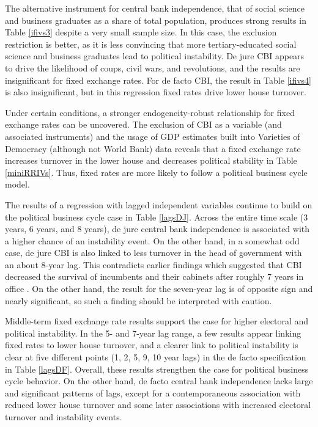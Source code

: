 \documentclass{article}
\begin{document}
    
    

    The alternative instrument for central bank independence, that of social science and business graduates as a share of total population, produces strong results in Table \ref*{ifivs3} despite a very small sample size. In this case, the exclusion restriction is better, as it is less convincing that more tertiary-educated social science and business graduates lead to political instability. De jure CBI appears to drive the likelihood of coups, civil wars, and revolutions, and the results are insignificant for fixed exchange rates. For de facto CBI, the result in Table \ref*{ifivs4} is also insignificant, but in this regression fixed rates drive lower house turnover.

    
    

    Under certain conditions, a stronger endogeneity-robust relationship for fixed exchange rates can be uncovered. The exclusion of CBI as a variable (and associated instruments) and the usage of GDP estimates built into Varieties of Democracy (although not World Bank) data reveals that a fixed exchange rate increases turnover in the lower house and decreases political stability in Table \ref*{miniRRIVs}. Thus, fixed rates are more likely to follow a political business cycle model.

    

    The results of a regression with lagged independent variables continue to build on the political business cycle case in Table \ref*{lagsDJ}. Across the entire time scale (3 years, 6 years, and 8 years), de jure central bank independence is associated with a higher chance of an instability event. On the other hand, in a somewhat odd case, de jure CBI is also linked to less turnover in the head of government with an about 8-year lag. This contradicts earlier findings which suggested that CBI decreased the survival of incumbents and their cabinets after roughly 7 years in office \citep{clark_monetary_2013}. On the other hand, the result for the seven-year lag is of opposite sign and nearly significant, so such a finding should be interpreted with caution.

    Middle-term fixed exchange rate results support the case for higher electoral and political instability. In the 5- and 7-year lag range, a few results appear linking fixed rates to lower house turnover, and a clearer link to political instability is clear at five different points (1, 2, 5, 9, 10 year lags) in the de facto specification in Table \ref*{lagsDF}. Overall, these results strengthen the case for political business cycle behavior. On the other hand, de facto central bank independence lacks large and significant patterns of lags, except for a contemporaneous association with reduced lower house turnover and some later associations with increased electoral turnover and instability events.
\end{document}
